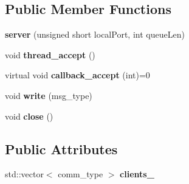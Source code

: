 \subsection*{\-Public \-Member \-Functions}
\begin{DoxyCompactItemize}
\item 
\hypertarget{classgal_1_1network_1_1server_a6a32bfaf00473ece2a662178aff0f94b}{{\bfseries server} (unsigned short local\-Port, int queue\-Len)}\label{classgal_1_1network_1_1server_a6a32bfaf00473ece2a662178aff0f94b}

\item 
\hypertarget{classgal_1_1network_1_1server_a15ed05d13f3c164f019319bbf919461e}{void {\bfseries thread\-\_\-accept} ()}\label{classgal_1_1network_1_1server_a15ed05d13f3c164f019319bbf919461e}

\item 
\hypertarget{classgal_1_1network_1_1server_a559c28e8c77194b40da278d165407d9b}{virtual void {\bfseries callback\-\_\-accept} (int)=0}\label{classgal_1_1network_1_1server_a559c28e8c77194b40da278d165407d9b}

\item 
\hypertarget{classgal_1_1network_1_1server_a2fe739a1f9f309f36560cb451082b67f}{void {\bfseries write} (msg\-\_\-type)}\label{classgal_1_1network_1_1server_a2fe739a1f9f309f36560cb451082b67f}

\item 
\hypertarget{classgal_1_1network_1_1server_a338a20b03a964019c062111791c41873}{void {\bfseries close} ()}\label{classgal_1_1network_1_1server_a338a20b03a964019c062111791c41873}

\end{DoxyCompactItemize}
\subsection*{\-Public \-Attributes}
\begin{DoxyCompactItemize}
\item 
\hypertarget{classgal_1_1network_1_1server_a08530e8046e4966c9388fc9f8bcd371f}{std\-::vector$<$ comm\-\_\-type $>$ {\bfseries clients\-\_\-}}\label{classgal_1_1network_1_1server_a08530e8046e4966c9388fc9f8bcd371f}

\end{DoxyCompactItemize}
